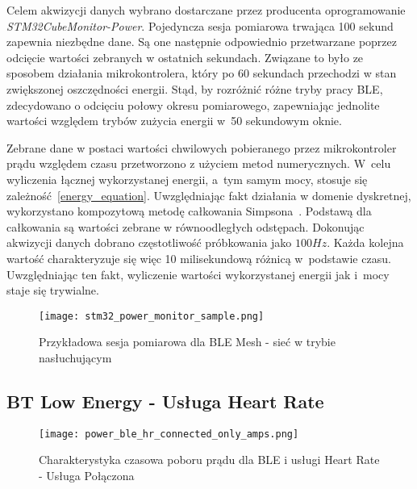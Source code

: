 Celem akwizycji danych wybrano dostarczane przez producenta oprogramowanie \textit{STM32CubeMonitor-Power}.
Pojedyncza sesja pomiarowa trwająca 100 sekund zapewnia niezbędne dane. Są one następnie
odpowiednio przetwarzane poprzez odcięcie wartości zebranych w ostatnich sekundach. Związane to było
ze sposobem działania mikrokontrolera, który po 60 sekundach przechodzi w stan zwiększonej
oszczędności energii. Stąd, by rozróżnić różne tryby pracy \gls{BLE}, zdecydowano o odcięciu
połowy okresu pomiarowego, zapewniając jednolite wartości względem trybów zużycia energii
w~50 sekundowym oknie.

Zebrane dane w postaci wartości chwilowych pobieranego przez mikrokontroler prądu względem czasu
przetworzono z użyciem metod numerycznych. W~celu wyliczenia łącznej wykorzystanej energii, a~tym samym
mocy, stosuje się zależność~\ref{energy_equation}. Uwzględniając fakt działania w domenie dyskretnej,
wykorzystano kompozytową metodę całkowania Simpsona~\cite{noauthor_scipyintegratesimpson_nodate}.
Podstawą dla całkowania są wartości zebrane w równoodległych odstępach. Dokonując akwizycji danych
dobrano częstotliwość próbkowania jako $100Hz$. Każda kolejna wartość charakteryzuje się więc
10 milisekundową różnicą w~podstawie czasu. Uwzględniając ten fakt, wyliczenie wartości
wykorzystanej energii jak i~mocy staje się trywialne.

\begin{figure}[!htb]
	\centering \texttt{[image: stm32\_power\_monitor\_sample.png]}
	\caption{Przykładowa sesja pomiarowa dla BLE Mesh - sieć w trybie nasłuchującym}
	\label{rys:measurement_session_sample}
\end{figure}

\subsection{BT Low Energy - Usługa Heart Rate}

\lipsum[1-3]
\begin{figure}[!htb]
	\centering \texttt{[image: power\_ble\_hr\_connected\_only\_amps.png]}
	\caption{Charakterystyka czasowa poboru prądu dla BLE i usługi Heart Rate - Usługa Połączona}
	\label{rys:power_ble_hr_connected_only_amps}
\end{figure}

